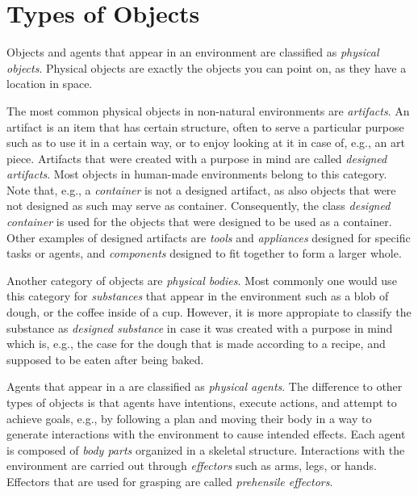 \section{Types of Objects}
\label{sec:background:types}

Objects and agents that appear in an environment are classified as \emph{physical objects}.
Physical objects are exactly the objects you can point on, as they have a location in space.

The most common physical objects in non-natural environments are \emph{artifacts}.
An artifact is an item that has certain structure, often to serve a particular purpose such as to use it in a certain way, or to enjoy looking at it in case of, e.g., an art piece.
Artifacts that were created with a purpose in mind are called \emph{designed artifacts}.
Most objects in human-made environments belong to this category.
Note that, e.g., a \emph{container} is not a designed artifact, as also objects that were not designed as such may serve as container.
Consequently, the class \emph{designed container} is used for the objects that were designed to be used as a container.
Other examples of designed artifacts are \emph{tools} and \emph{appliances} designed for specific tasks or agents, and \emph{components} designed to fit together to form a larger whole.

Another category of objects are \emph{physical bodies}.
Most commonly one would use this category for \emph{substances} that appear in the environment such as a blob of dough, or the coffee inside of a cup.
However, it is more appropiate to classify the substance as \emph{designed substance} in case it was created with a purpose in mind which is, e.g., the case for the dough that is made according to a recipe, and supposed to be eaten after being baked.

Agents that appear in a \neem are classified as \emph{physical agents}.
The difference to other types of objects is that agents have intentions, execute actions, and attempt to achieve goals, e.g., by following a plan and moving their body in a way to generate interactions with the environment to cause intended effects.
Each agent is composed of \emph{body parts} organized in a skeletal structure. 
Interactions with the environment are carried out through \emph{effectors} such as arms, legs, or hands.
Effectors that are used for grasping are called \emph{prehensile effectors}.

